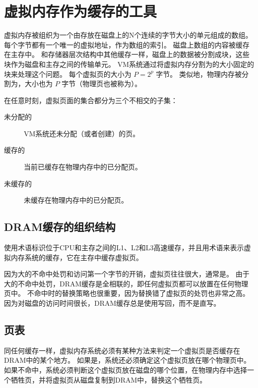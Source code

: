 
\section{虚拟内存作为缓存的工具}
{
    虚拟内存被组织为一个由存放在磁盘上的N个连续的字节大小的单元组成的数组。
    每个字节都有一个唯一的虚拟地址，作为数组的索引。
    磁盘上数组的内容被缓存在主存中。
    和存储器层次结构中其他缓存一样，磁盘上的数据被分割成块，这些块作为磁盘和主存之间的传输单元。
    VM系统通过将虚拟内存分割为的大小固定的块来处理这个问题。
    每个虚拟页的大小为 $P = 2^p$ 字节。
    类似地，物理内存被分割为，大小也为 $P$ 字节（物理页也被称为）。

    在任意时刻，虚拟页面的集合都分为三个不相交的子集：

    \begin{description}
        \item[未分配的] VM系统还未分配（或者创建）的页。
        \item[缓存的] 当前已缓存在物理内存中的已分配页。
        \item[未缓存的] 未缓存在物理内存中的已分配页。
    \end{description}

    \subsection{DRAM缓存的组织结构}
    {
        使用术语标识位于CPU和主存之间的L1、L2和L3高速缓存，并且用术语来表示虚拟内存系统的缓存，它在主存中缓存虚拟页。

        因为大的不命中处罚和访问第一个字节的开销，虚拟页往往很大，通常是。
        由于大的不命中处罚，DRAM缓存是全相联的，即任何虚拟页都可以放置在任何物理页中。
        不命中时的替换策略也很重要，因为替换错了虚拟页的处罚也非常之高。
        因为对磁盘的访问时间很长，DRAM缓存总是使用写回，而不是直写。
    }

    \subsection{页表}
    {
        同任何缓存一样，虚拟内存系统必须有某种方法来判定一个虚拟页是否缓存在DRAM中的某个地方。
        如果是，系统还必须确定这个虚拟页放在哪个物理页中。
        如果不命中，系统必须判断这个虚拟页放在磁盘的哪个位置，在物理内存中选择一个牺牲页，并将虚拟页从磁盘复制到DRAM中，替换这个牺牲页。

}}
